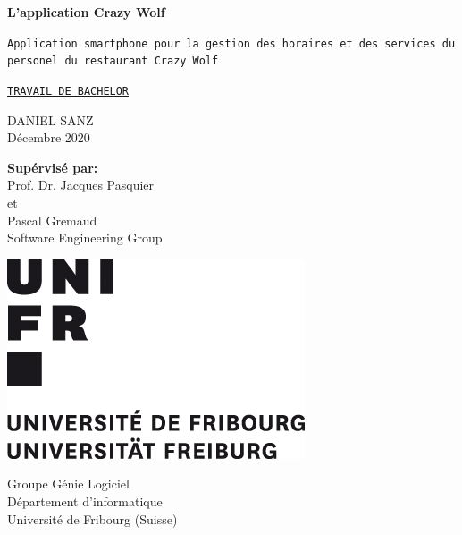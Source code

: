 \begin{titlepage}
    \begin{center}
        \vspace*{1cm}

        \Huge
        \textsf{\textbf{L'application Crazy Wolf}}
 
        \vspace{0.5cm}
        \LARGE
        \texttt{Application smartphone pour la gestion des horaires
        et des services du personel du restaurant Crazy Wolf}
             
        \vspace{1.5cm}
        \large
        \underline{\texttt{TRAVAIL DE BACHELOR}}

        \vspace{2.0cm}
        \Large
        DANIEL SANZ \\
        \large
        Décembre 2020
             
        \vspace{2.0cm}
        \textbf{Supérvisé par:}\\
        Prof. Dr. Jacques Pasquier\\
        et\\
        Pascal Gremaud\\
        Software Engineering Group
        \vfill
        \hrulefill

        \begin{minipage}[c]{0.2\textwidth}
            \centering
            \includegraphics{logos/unifr_logo.png}   
        \end{minipage}
        \begin{minipage}[c]{0.4\textwidth}
            \centering
            \normalsize
            Groupe Génie Logiciel\\
            Département d'informatique\\
            Université de Fribourg (Suisse)
        \end{minipage}
        \begin{minipage}[c]{0.3\textwidth}
            \centering


\end{minipage}
\end{center}
\end{titlepage}
